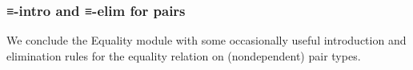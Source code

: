 \subsubsection{≡-intro and ≡-elim for pairs}\label{intro-and--elim-for-pairs}
We conclude the Equality module with some occasionally useful introduction and elimination rules for the equality relation on (nondependent) pair types.
\ccpad
\begin{code}%
\>[0]\AgdaSpace{}%
\AgdaSymbol{:}%
\>[200I]\AgdaSymbol{\{}\AgdaSpace{}%
\AgdaSpace{}%
\AgdaSymbol{:}\AgdaSpace{}%
\AgdaSymbol{\}}\AgdaSpace{}%
\AgdaSymbol{\{}\AgdaSpace{}%
\AgdaSpace{}%
\AgdaSymbol{:}\AgdaSpace{}%
\AgdaSpace{}%
\AgdaSymbol{\}}\AgdaSpace{}%
\AgdaSymbol{\{}\AgdaSpace{}%
\AgdaSpace{}%
\AgdaSymbol{:}\AgdaSpace{}%
\AgdaSpace{}%
\AgdaSymbol{\}}\<%
\\
\>[1]%
\>[.][@{}l@{}]\<[200I]%
\>[14]\AgdaSymbol{(}\AgdaSpace{}%
\AgdaOperator{\AgdaInductiveConstructor{,}}\AgdaSpace{}%
\AgdaSymbol{)}\AgdaSpace{}%
\AgdaSpace{}%
\AgdaSymbol{(}\AgdaSpace{}%
\AgdaOperator{\AgdaInductiveConstructor{,}}\AgdaSpace{}%
\AgdaSymbol{)}\<%
\\
%
\>[14]\AgdaComment{----------------------}\<%
\\
%
\>[1]%
\>[14]\AgdaSpace{}%
\AgdaSpace{}%
\<%
\\
%
\>[0]\AgdaSpace{}%
\AgdaSpace{}%
\AgdaSymbol{=}\AgdaSpace{}%
\AgdaSpace{}%
\AgdaSpace{}%
\<%
\\
%
\\
%
\>[0]\AgdaSpace{}%
\AgdaSymbol{:}%
\>[227I]\AgdaSymbol{\{}\AgdaSpace{}%
\AgdaSpace{}%
\AgdaSymbol{:}\AgdaSpace{}%
\AgdaSymbol{\}}\AgdaSpace{}\AgdaSymbol{\{}\AgdaSpace{}%
\AgdaSpace{}%
\AgdaSymbol{:}\AgdaSpace{}%
\AgdaSpace{}%
\AgdaSymbol{\}\{}\AgdaSpace{}%
\AgdaSpace{}%
\AgdaSymbol{:}\AgdaSpace{}%
\AgdaSpace{}%
\AgdaSymbol{\}}\<%
\\

\end{code}
